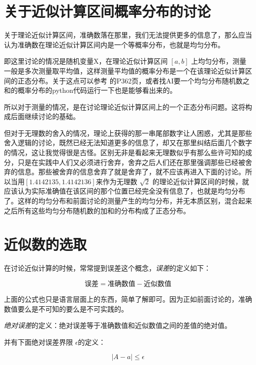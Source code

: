 \documentclass[12pt,oneside]{book}
\providecommand{\abs}[1]{\lvert#1\rvert}
\begin{document}
\section{关于近似计算区间概率分布的讨论}
关于理论近似计算区间，准确数落在那里，我们无法提供更多的信息了，那么应当认为准确数在理论近似计算区间内是一个等概率分布，也就是均匀分布。

即这里讨论的情况是随机变量X，在理论近似计算区间 $ [a, b] $ 上均匀分布，测量一般是多次测量取平均值，这样测量平均值的概率分布是一个在该理论近似计算区间的正态分布。关于这点可以参考\cite{普林斯顿概率论读本} 的P362页，或者找AI要一个均匀分布随机数之和的概率分布的python代码运行一下也是能够看出来的。

所以对于测量的情况，是在讨论理论近似计算区间上的一个正态分布问题。这将构成后面继续讨论的基础。

但对于无理数的舍入的情况，理论上获得的那一串尾部数字让人困惑，尤其是那些舍入逻辑的讨论，既然已经无法知道更多的信息了，却又在那里纠结后面几个数字的情况，这让我觉得很是古怪。区别无非是看起来无理数似乎有那么些许可知的成分，只是在实践中人们又必须进行舍弃，舍弃之后人们还在那里强调那些已经被舍弃的信息。那些被舍弃的信息舍弃了就是舍弃了，就不应该再进入下面的讨论。所以当用$ [1.4142135, 1.4142136] $来作为无理数 $\sqrt{2}$ 的理论近似计算区间的时候，就应该认为实际准确值在该区间的那个位置已经完全没有信息了，也就是均匀分布了。这样的均匀分布和前面讨论的测量产生的均匀分布，并无本质区别，混合起来之后所有这些均匀分布随机数的加和的分布构成了正态分布。



\section{近似数的选取}
在讨论近似计算的时候，常常提到误差这个概念，\emph{误差}的定义如下：

\begin{equation*}
\text{误差} = \text{准确数值} - \text{近似数值}
\end{equation*}

上面的公式也只是语言层面上的东西，简单了解即可。因为正如前面讨论的，准确数值要么是不可知的要么是不可实践的。

\emph{绝对误差}的定义：绝对误差等于准确数值和近似数值之间的差值的绝对值。

并有下面绝对误差界限 $ \epsilon $的定义：

\begin{equation}
\abs{A - a} \leqslant \epsilon
\end{equation}
\end{document}
